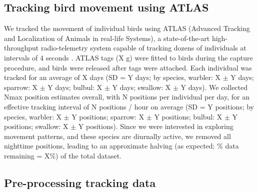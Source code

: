 \begin{refsection}
\subsection*{Tracking bird movement using ATLAS}

We tracked the movement of individual birds using ATLAS (Advanced Tracking and Localization of Animals in real-life Systems), a state-of-the-art high-throughput radio-telemetry system capable of tracking dozens of individuals at intervals of 4 seconds \citep{weiser2016,toledo2014,toledo2020}.
ATLAS tags ({\color{red}X g}) were fitted to birds during the capture procedure, and birds were released after tags were attached.
Each individual was tracked for an average of X days (SD = Y days; by species, warbler: X $\pm$ Y days; sparrow: X $\pm$ Y days; bulbul: X $\pm$ Y days; swallow: X $\pm$ Y days).
We collected Nmax position estimates overall, with N positions per individual per day, for an effective tracking interval of N positions / hour on average (SD = Y positions; by species, warbler: X $\pm$ Y positions; sparrow: X $\pm$ Y positions; bulbul: X $\pm$ Y positions; swallow: X $\pm$ Y positions).
Since we were interested in exploring movement patterns, and these species are diurnally active, we removed all nighttime positions, leading to an approximate halving (as expected; \% data remaining = X\%) of the total dataset.

\subsection*{Pre-processing tracking data}


\end{refsection}
